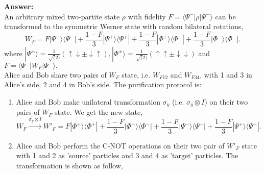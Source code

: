 \documentclass[english,aps,onecolumn]{revtex4-1}
\begin{document}
\begin{enumerate}[1.]
\textbf{Answer:}\\
  An arbitrary mixed two-partite state $\rho$ with fidelity $F=\langle \Psi^-|\rho|\Psi^-\rangle$ can be transformed to the symmetric Werner state with random bilateral rotations,  $$W_F = F|\Psi^-\rangle\langle\Psi^-|+\frac{1-F}{3}|\Psi^+\rangle\langle\Psi^+|
+\frac{1-F}{3}|\Phi^+\rangle\langle\Phi^+|+\frac{1-F}{3}|\Phi^-\rangle\langle\Phi^-|.$$
 where $|\Psi^{\pm}\rangle=\frac{1}{\sqrt(2)}(\uparrow\downarrow\pm\downarrow\uparrow), |\Phi^{\pm}\rangle=\frac{1}{\sqrt(2)}(\uparrow\uparrow\pm\downarrow\downarrow)$ and $F=\langle \Psi^-|W_F|\Psi^-\rangle.$ \\
Alice and Bob share two pairs of $W_F$ state, i.e. $W_{F12}$ and $W_{F34}$, with 1 and 3 in Alice's side, 2 and 4 in Bob's side. The purification protocol is:
 \begin{enumerate}
   \item Alice and Bob make unilateral transformation $\sigma_y$ (i.e. $\sigma_y\otimes I$) on their two pairs of $W_F$ state. We get the new state,  $$  W_F  \xrightarrow{\sigma_y\otimes I}W'_F = F|\Phi^+\rangle\langle\Phi^+|+\frac{1-F}{3}|\Phi^-\rangle\langle\Phi^-|
+\frac{1-F}{3}|\Psi^-\rangle\langle\Psi^-|+\frac{1-F}{3}|\Psi^+\rangle\langle\Psi^+|.$$
   \item Alice and Bob perform the C-NOT operations on their two pair of $W'_F$ state with 1 and 2 as 'source' particles and 3 and 4 as 'target' particles. The transformation is shown as follow,
       \begin{table}[!htp]
\centering\renewcommand{}
  \begin{tabular}{c c c c}


\end{tabular}
\end{table}
\end{enumerate}
\end{enumerate}
\end{document}

